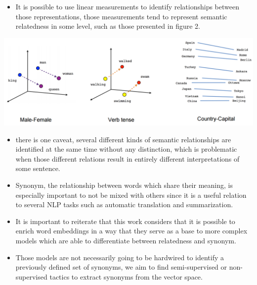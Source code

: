 \documentclass[a0,portrait]{a0poster}
\begin{document}
\begin{multicols}{2}
\begin{itemize}
	\item It is possible to use linear measurements to identify relationships between those representations, those measurements tend to represent semantic relatedness in some level, such as those presented in figure 2.\\
\end{itemize}

\begin{center}\vspace{1cm}
	\includegraphics[width=0.8\linewidth]{linear-relationships.png}
\end{center}\vspace{1cm}


\begin{itemize} 
	\item there is one caveat, several different kinds of semantic relationships are identified at the same time without any distinction, which is problematic when those different relations result in entirely different interpretations of some sentence. \\
	\item Synonym, the relationship between words which share their meaning, is especially important to not be mixed with others since it is a useful relation to several NLP tasks such as automatic translation and summarization.
	\item It is important to reiterate that this work considers that it is possible to enrich word embeddings in a way that they serve as a base to more complex models which are able to differentiate between relatedness and synonym. \\
	\item Those models are not necessarily going to be hardwired to identify a previously defined set of synonyms, we aim to find semi-supervised or non-supervised tactics to extract synonyms from the vector space.\\
\end{itemize}


\end{multicols}
\end{document}
